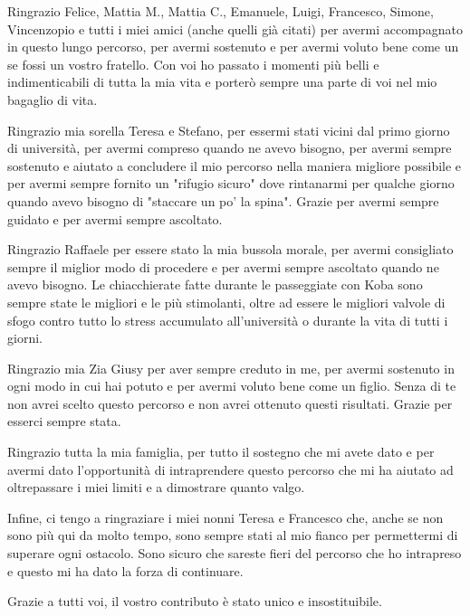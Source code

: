 Ringrazio Felice, Mattia M., Mattia C., Emanuele, Luigi, Francesco, Simone, Vincenzopio e tutti i miei amici (anche quelli già citati) per avermi accompagnato in questo lungo percorso, per avermi sostenuto e per avermi voluto bene come un se fossi un vostro fratello. Con voi ho passato i momenti più belli e indimenticabili di tutta la mia vita e porterò sempre una parte di voi nel mio bagaglio di vita.

Ringrazio mia sorella Teresa e Stefano, per essermi stati vicini dal primo giorno di università, per avermi compreso quando ne avevo bisogno, per avermi sempre sostenuto e aiutato a concludere il mio percorso nella maniera migliore possibile e per avermi sempre fornito un "rifugio sicuro" dove rintanarmi per qualche giorno quando avevo bisogno di "staccare un po' la spina". Grazie per avermi sempre guidato e per avermi sempre ascoltato.

Ringrazio Raffaele per essere stato la mia bussola morale, per avermi consigliato sempre il miglior modo di procedere e per avermi sempre ascoltato quando ne avevo bisogno. Le chiacchierate fatte durante le passeggiate con Koba sono sempre state le migliori e le più stimolanti, oltre ad essere le migliori valvole di sfogo contro tutto lo stress accumulato all'università o durante la vita di tutti i giorni.

Ringrazio mia Zia Giusy per aver sempre creduto in me, per avermi sostenuto in ogni modo in cui hai potuto e per avermi voluto bene come un figlio. Senza di te non avrei scelto questo percorso e non avrei ottenuto questi risultati. Grazie per esserci sempre stata.

Ringrazio tutta la mia famiglia, per tutto il sostegno che mi avete dato e per avermi dato l'opportunità di intraprendere questo percorso che mi ha aiutato ad oltrepassare i miei limiti e a dimostrare quanto valgo.

Infine, ci tengo a ringraziare i miei nonni Teresa e Francesco che, anche se non sono più qui da molto tempo, sono sempre stati al mio fianco per permettermi di superare ogni ostacolo. Sono sicuro che sareste fieri del percorso che ho intrapreso e questo mi ha dato la forza di continuare.

Grazie a tutti voi, il vostro contributo è stato unico e insostituibile.